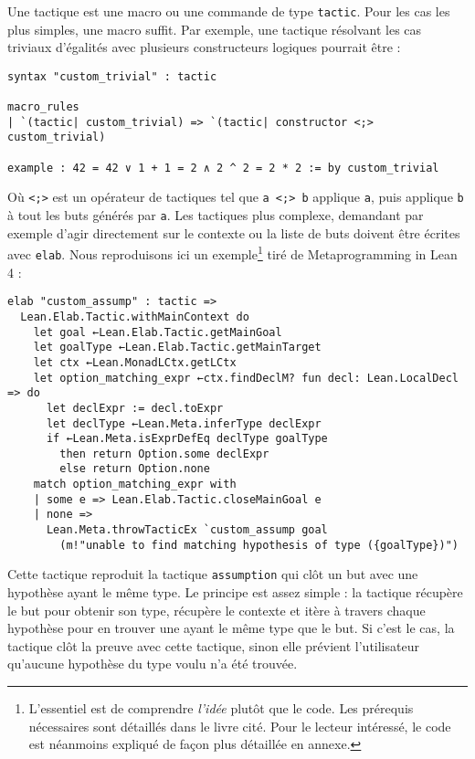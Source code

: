 \documentclass[a4paper, 12pt]{article}
\newcommand{\lean}[1]{\texttt{#1}}
\begin{document}
\vspace{\baselineskip}
Une tactique est une macro ou une commande de type \lean{tactic}. Pour les cas les plus simples, une macro suffit. Par exemple, une tactique résolvant les cas triviaux d'égalités avec plusieurs constructeurs logiques pourrait être :

\begin{verbatim}
syntax "custom_trivial" : tactic

macro_rules
| `(tactic| custom_trivial) => `(tactic| constructor <;> custom_trivial)

example : 42 = 42 ∨ 1 + 1 = 2 ∧ 2 ^ 2 = 2 * 2 := by custom_trivial
\end{verbatim}

Où \lean{<;>} est un opérateur de tactiques tel que \lean{a <;> b} applique \lean{a}, puis applique \lean{b} à tout les buts générés par \lean{a}. Les tactiques plus complexe, demandant par exemple d'agir directement sur le contexte ou la liste de buts doivent être écrites avec \lean{elab}. Nous reproduisons ici un exemple\footnote{L'essentiel est de comprendre \textit{l'idée} plutôt que le code. Les prérequis nécessaires sont détaillés dans le livre cité. Pour le lecteur intéressé, le code est néanmoins expliqué de façon plus détaillée en annexe.} tiré de Metaprogramming in Lean 4 \cite{meta_lean} :

\begin{listing}[H]
    \begin{verbatim}
elab "custom_assump" : tactic =>
  Lean.Elab.Tactic.withMainContext do
    let goal ←Lean.Elab.Tactic.getMainGoal
    let goalType ←Lean.Elab.Tactic.getMainTarget
    let ctx ←Lean.MonadLCtx.getLCtx
    let option_matching_expr ←ctx.findDeclM? fun decl: Lean.LocalDecl => do
      let declExpr := decl.toExpr
      let declType ←Lean.Meta.inferType declExpr
      if ←Lean.Meta.isExprDefEq declType goalType
        then return Option.some declExpr
        else return Option.none
    match option_matching_expr with
    | some e => Lean.Elab.Tactic.closeMainGoal e
    | none =>
      Lean.Meta.throwTacticEx `custom_assump goal
        (m!"unable to find matching hypothesis of type ({goalType})")
    \end{verbatim}
    \label{code:custom_assump}
\end{listing}

Cette tactique reproduit la tactique \lean{assumption} qui clôt un but avec une hypothèse ayant le même type. Le principe est assez simple : la tactique récupère le but pour obtenir son type, récupère le contexte et itère à travers chaque hypothèse pour en trouver une ayant le même type que le but. Si c'est le cas, la tactique clôt la preuve avec cette tactique, sinon elle prévient l'utilisateur qu'aucune hypothèse du type voulu n'a été trouvée.
\end{document}
